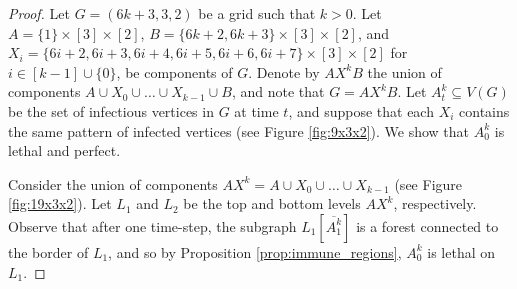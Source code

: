 \begin{proof}



Let $G=(6k+3,3,2)$ be a grid such that $k>0$. Let $A = \{1\} \times [3] \times [2]$, $B = \{6k+2, 6k+3\} \times [3] \times [2]$, and $X_i = \{6i+2,6i+3,6i+4,6i+5,6i+6,6i+7\} \times [3] \times [2]$ for $i \in [k - 1] \cup \{0\}$, be components of $G$. Denote by $AX^kB$ the union of components $A \cup X_0 \cup \dots \cup X_{k-1} \cup B$, and note that $G=AX^kB$. Let $A_t^k \subseteq V(G)$ be the set of infectious vertices in $G$ at time $t$, and suppose that each $X_i$ contains the same pattern of infected vertices (see Figure \ref{fig:9x3x2}). We show that $A_0^k$ is lethal and perfect. 

Consider the union of components $AX^k = A \cup X_0 \cup \dots \cup X_{k-1}$ (see Figure \ref{fig:19x3x2}). Let $L_1$ and $L_2$ be the top and bottom levels $AX^k$, respectively. Observe that after one time-step, the subgraph $L_1[\overline{A_1^k}]$ is a forest connected to the border of $L_1$, and so by Proposition \ref{prop:immune_regions}, $A_0^k$ is lethal on $L_1$. 


\end{proof}
